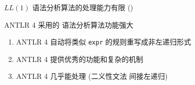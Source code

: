 


\begin{frame}{}
  \begin{center}
    $LL(1)$ 语法分析算法的处理能力有限 ()


    \pause
    ANTLR 4 采用的  语法分析算法功能强大
  \end{center}
\end{frame}

\begin{frame}{}
  \begin{center}
  \end{center}

  \vspace{0.30cm}
  \begin{enumerate}[(1)]
    \setlength{\itemsep}{8pt}
    \pause
    \item ANTLR 4 自动将类似 \texttt{expr} 的规则重写成非左递归形式
    \pause
    \item ANTLR 4 提供优秀的功能和复杂的机制
    \pause
    \item ANTLR 4 几乎能处理 (二义性文法\cmark \;\; 间接左递归\xmark)
  \end{enumerate}
\end{frame}

